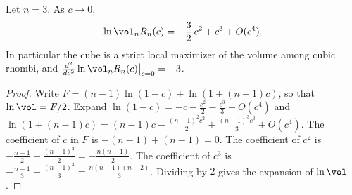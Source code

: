 \begin{theorem}\label{thm:main}
Let $n=3$. As $c\to0$,
\[
\ln\vol_nR_n(c)=- \frac{3}{2}\,c^2+c^3+O(c^4).
\]
In particular the cube is a strict local maximizer of the volume among cubic rhombi, and $\frac{d^2}{dc^2}\ln\vol_nR_n(c)\big|_{c=0}=-3$.
\end{theorem}
\begin{proof}
Write $F=(n-1)\ln(1-c)+\ln(1+(n-1)c)$, so that $\ln\vol=F/2$.
Expand $\ln(1-c)=-c-\frac{c^2}{2}-\frac{c^3}{3}+O(c^4)$ and $\ln(1+(n-1)c)=(n-1)c-\frac{(n-1)^2c^2}{2}+\frac{(n-1)^3c^3}{3}+O(c^4)$.
The coefficient of $c$ in $F$ is $-(n-1)+(n-1)=0$.
The coefficient of $c^2$ is $-\frac{n-1}{2}-\frac{(n-1)^2}{2}=-\frac{n(n-1)}{2}$.
The coefficient of $c^3$ is $-\frac{n-1}{3}+\frac{(n-1)^3}{3}=\frac{n(n-1)(n-2)}{3}$.
Dividing by $2$ gives the expansion of $\ln\vol$.
\end{proof}

